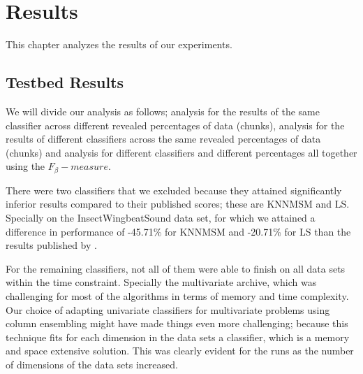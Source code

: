 \chapter{Results}
\label{ChapterResults}
This chapter analyzes the results of our experiments.


\section{Testbed Results}
\label{SectionTestbedResults}
We will divide our analysis as follows;
analysis for the results of the same classifier across different revealed percentages of data (chunks),
analysis for the results of different classifiers across the same revealed percentages of data (chunks)
and analysis for different classifiers and different percentages all together using the $F_{\beta}-measure$.


There were two classifiers that we excluded because they attained significantly inferior results compared to their published scores; these are KNNMSM and LS.
Specially on the InsectWingbeatSound data set, for which we attained a difference in performance of -45.71\% for KNNMSM and -20.71\% for LS than the results published by \cite{bagnall2017great}.


For the remaining classifiers, not all of them were able to finish on all data sets within the time constraint.
Specially the multivariate archive, which was challenging for most of the algorithms in terms of memory and time complexity.
Our choice of adapting univariate classifiers for multivariate problems using column ensembling might have made things even more challenging;
because this technique fits for each dimension in the data sets a classifier, which is a memory and space extensive solution.
This was clearly evident for the runs as the number of dimensions of the data sets increased.

